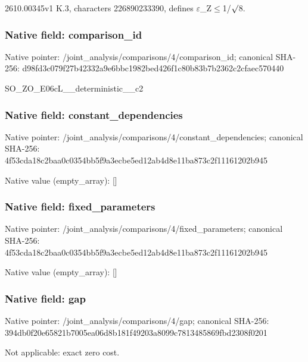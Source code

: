 \documentclass[10pt,a4paper]{article}
\begin{document}
2610.00345v1 K.3, characters 226890233390, defines \ensuremath{\varepsilon}\_Z\ensuremath{\le}1/\ensuremath{\sqrt{\vphantom{x}}}8.


\subsubsection{Native field: comparison\_id}


Native pointer: /joint\_analysis/comparis\allowbreak{}ons/4/comparison\_id; canonical SHA-256: d98fd3c079f27b42332a9e6b\allowbreak{}bc1982bed426f1c80b83b7b2\allowbreak{}362c2cfaec570440


SO\_ZO\_E06cL\_\_deterministic\_\_c2


\subsubsection{Native field: constant\_dependencies}


Native pointer: /joint\_analysis/comparis\allowbreak{}ons/4/constant\_dependenc\allowbreak{}ies; canonical SHA-256: 4f53cda18c2baa0c0354bb5f\allowbreak{}9a3ecbe5ed12ab4d8e11ba87\allowbreak{}3c2f11161202b945



Native value (empty\_array): []



\subsubsection{Native field: fixed\_parameters}


Native pointer: /joint\_analysis/comparis\allowbreak{}ons/4/fixed\_parameters; canonical SHA-256: 4f53cda18c2baa0c0354bb5f\allowbreak{}9a3ecbe5ed12ab4d8e11ba87\allowbreak{}3c2f11161202b945



Native value (empty\_array): []



\subsubsection{Native field: gap}


Native pointer: /joint\_analysis/comparisons/4/gap; canonical SHA-256: 394db0f20e65821b7005ea06\allowbreak{}d8b181f49203a8099c781348\allowbreak{}5869fbd2308f0201


Not applicable: exact zero cost.
\end{document}
